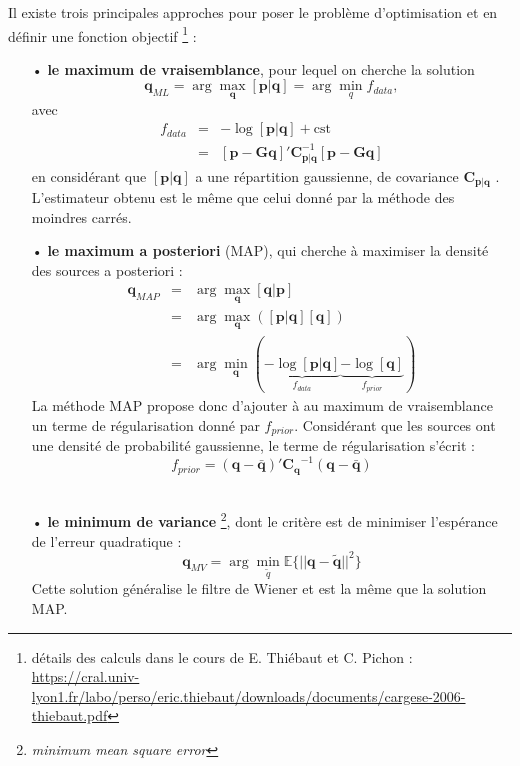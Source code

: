 Il existe trois principales approches pour poser le problème d'optimisation et en définir une fonction objectif \footnote{détails des calculs dans le cours de E. Thiébaut et C. Pichon : \url{https://cral.univ-lyon1.fr/labo/perso/eric.thiebaut/downloads/documents/cargese-2006-thiebaut.pdf}} : 
\begin{itemize}
	\item[•] \textbf{le maximum de vraisemblance}, pour lequel on cherche la solution 
	\begin{equation}
		\bm{q}_{ML} = \arg\max_{\bm{q}} [ \bm{p}|\bm{q} ]=\arg\min_q f_{data},
	\end{equation}	
	 avec 
	\begin{eqnarray}
		f_{data} &=&-\log[\bm{p}|\bm{q}] + \text{cst}\\
				 &=& [\bm{p}-\bm{Gq}]'  \bm{C}_{\bm{p}|\bm{q}}^{-1}  [\bm{p}-\bm{Gq}]
	\end{eqnarray}
	en considérant que $[ \bm{p}|\bm{q} ]$ a une répartition gaussienne, de covariance $\bm{C}_{\bm{p}|\bm{q}}$ . L'estimateur obtenu est le même que celui donné par la méthode des moindres carrés.\\
	 	
	\item[•] \textbf{le maximum a posteriori} (MAP), qui cherche à maximiser la densité des sources a posteriori : 
	\begin{eqnarray}
		\bm{q}_{MAP} &=& \arg\max_{\bm{q}}[ \bm{q} |  \bm{p}  ]\\
					& =& \arg\max_{\bm{q}}([\bm{p} | \bm{q}][\bm{q}])\\
					&=& \arg\min_{\bm{q}} ( \underbrace{-\log[\bm{p}|\bm{q}]}_{f_{data}} \underbrace{- \log[\bm{q}]}_{f_{prior}})
	\end{eqnarray}
	La méthode MAP propose donc d'ajouter à au maximum de vraisemblance un terme de régularisation donné par $f_{prior}$. Considérant que les sources ont une densité de probabilité gaussienne, le terme de régularisation s'écrit : 
	\begin{equation}
		f_{prior}= (\bm{q}- \bm{\bar{q}})' \bm{C_q}^{-1}(\bm{q}- \bm{\bar{q}})
	\end{equation}\\	
	
	\item[•] \textbf{le minimum de variance} \footnote{\textit{minimum mean square error}}, dont le critère est de minimiser l'espérance de l'erreur quadratique : 
	\begin{equation}
		\bm{q}_{MV} = \arg\min_{\tilde{q}} \mathbb{E}\{||\bm{q}-\bm{\tilde{q}}||^2\}
	\end{equation}	
	Cette solution généralise le filtre de Wiener et est la même que la solution MAP. \\
\end{itemize}

